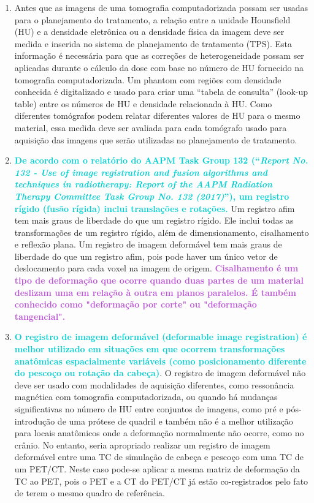 \documentclass[11pt,a4paper]{article}
\begin{document}
\begin{enumerate}
        \item Antes que as imagens de uma tomografia computadorizada possam ser usadas para o planejamento do tratamento, a relação entre a unidade Hounsfield (HU) e a densidade eletrônica ou a densidade física da imagem deve ser medida e inserida no sistema de planejamento de tratamento (TPS). Esta informação é necessária para que as correções de heterogeneidade possam ser aplicadas durante o cálculo da dose com base no número de HU fornecido na tomografia computadorizada. Um phantom com regiões com densidade conhecida é digitalizado e usado para criar uma ``tabela de consulta'' (look-up table) entre os números de HU e densidade relacionada à HU. Como diferentes tomógrafos podem relatar diferentes valores de HU para o mesmo material, essa medida deve ser avaliada para cada tomógrafo usado para aquisição das imagens que serão utilizadas no planejamento de tratamento.

        \item \textcolor{DarkTurquoise}{\textbf{De acordo com o relatório do AAPM Task Group 132 (``\textit{Report No. 132 - Use of image registration and fusion algorithms and techniques in radiotherapy: Report of the AAPM Radiation Therapy Committee Task Group No. 132 (2017)}''), um registro rígido (fusão rígida) inclui translações e rotações.}} Um registro afim tem mais graus de liberdade do que um registro rígido. Ele inclui todas as transformações de um registro rígido, além de dimensionamento, cisalhamento e reflexão plana. Um registro de imagem deformável tem mais graus de liberdade do que um registro afim, pois pode haver um único vetor de deslocamento para cada voxel na imagem de origem. \textcolor{MediumOrchid}{\textbf{Cisalhamento é um tipo de deformação que ocorre quando duas partes de um material deslizam uma em relação à outra em planos paralelos. É também conhecido como "deformação por corte" ou "deformação tangencial".}}

        \item \textcolor{DarkTurquoise}{\textbf{O registro de imagem deformável (deformable image registration) é melhor utilizado em situações em que ocorrem transformações anatômicas espacialmente variáveis (como posicionamento diferente do pescoço ou rotação da cabeça)}}. O registro de imagem deformável não deve ser usado com modalidades de aquisição diferentes, como ressonância magnética com tomografia computadorizada, ou quando há mudanças significativas no número de HU entre conjuntos de imagens, como pré e pós-introdução de uma prótese de quadril e também não é a melhor utilização para locais anatômicos onde a deformação normalmente não ocorre, como no crânio. No entanto, seria apropriado realizar um registro de imagem deformável entre uma TC de simulação de cabeça e pescoço com uma TC de um PET/CT. Neste caso pode-se aplicar a mesma matriz de deformação da TC ao PET, pois o PET e a CT do PET/CT já estão co-registrados pelo fato de terem o mesmo quadro de referência.
        

\end{enumerate}
\end{document}
